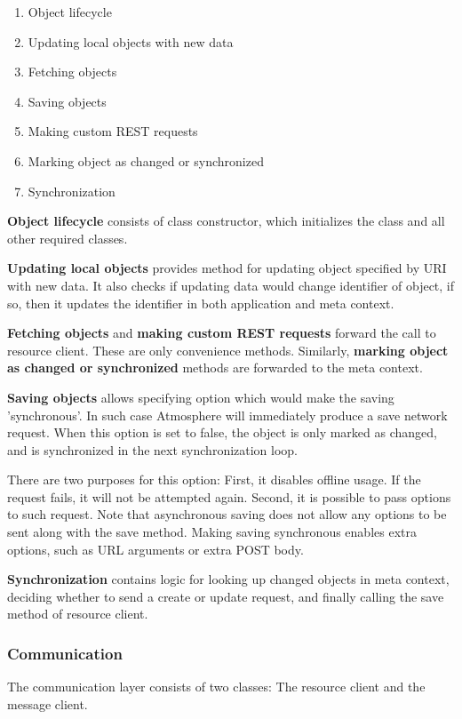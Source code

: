\begin{enumerate}
\item Object lifecycle
\item Updating local objects with new data
\item Fetching objects
\item Saving objects
\item Making custom REST requests
\item Marking object as changed or synchronized
\item Synchronization
\end{enumerate}

\textbf{Object lifecycle} consists of class constructor, which initializes the class and all other required classes.

\textbf{Updating local objects} provides method for updating object specified by URI with new data. It also checks if updating data would change identifier of object, if so, then it updates the identifier in both application and meta context.

\textbf{Fetching objects} and \textbf{making custom REST requests} forward the call to resource client. These are only convenience methods. Similarly, \textbf{marking object as changed or synchronized} methods are forwarded to the meta context.

\textbf{Saving objects} allows specifying option which would make the saving 'synchronous'. In such case Atmosphere will immediately produce a save network request. When this option is set to false, the object is only marked as changed, and is synchronized in the next synchronization loop.

There are two purposes for this option: First, it disables offline usage. If the request fails, it will not be attempted again. Second, it is possible to pass options to such request. Note that asynchronous saving does not allow any options to be sent along with the save method. Making saving synchronous enables extra options, such as URL arguments or extra POST body.

\textbf{Synchronization} contains logic for looking up changed objects in meta context, deciding whether to send a create or update request, and finally calling the save method of resource client.

\subsubsection{Communication}

The communication layer consists of two classes: The resource client and the message client.

